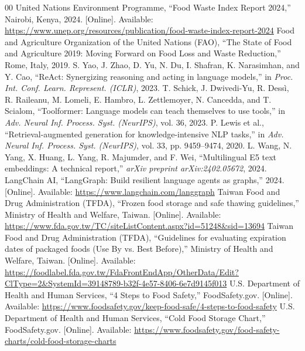 \documentclass[conference]{IEEEtran}
\begin{document}
\begin{thebibliography}{00}
 United Nations Environment Programme, ``Food Waste Index Report 2024,'' Nairobi, Kenya, 2024. [Online]. Available: \url{https://www.unep.org/resources/publication/food-waste-index-report-2024}
 Food and Agriculture Organization of the United Nations (FAO), ``The State of Food and Agriculture 2019: Moving Forward on Food Loss and Waste Reduction,'' Rome, Italy, 2019.
 S. Yao, J. Zhao, D. Yu, N. Du, I. Shafran, K. Narasimhan, and Y. Cao, ``ReAct: Synergizing reasoning and acting in language models,'' in \emph{Proc. Int. Conf. Learn. Represent. (ICLR)}, 2023.
 T. Schick, J. Dwivedi-Yu, R. Dess\`{i}, R. Raileanu, M. Lomeli, E. Hambro, L. Zettlemoyer, N. Cancedda, and T. Scialom, ``Toolformer: Language models can teach themselves to use tools,'' in \emph{Adv. Neural Inf. Process. Syst. (NeurIPS)}, vol. 36, 2023.
 P. Lewis et al., ``Retrieval-augmented generation for knowledge-intensive NLP tasks,'' in \emph{Adv. Neural Inf. Process. Syst. (NeurIPS)}, vol. 33, pp. 9459--9474, 2020.
 L. Wang, N. Yang, X. Huang, L. Yang, R. Majumder, and F. Wei, ``Multilingual E5 text embeddings: A technical report,'' \emph{arXiv preprint arXiv:2402.05672}, 2024.
 LangChain AI, ``LangGraph: Build resilient language agents as graphs,'' 2024. [Online]. Available: \url{https://www.langchain.com/langgraph}
 Taiwan Food and Drug Administration (TFDA), ``Frozen food storage and safe thawing guidelines,'' Ministry of Health and Welfare, Taiwan. [Online]. Available: \url{https://www.fda.gov.tw/TC/siteListContent.aspx?id=51248&sid=13694}
 Taiwan Food and Drug Administration (TFDA), ``Guidelines for evaluating expiration dates of packaged foods (Use By vs. Best Before),'' Ministry of Health and Welfare, Taiwan. [Online]. Available: \url{https://foodlabel.fda.gov.tw/FdaFrontEndApp/OtherData/Edit?ClType=2&SystemId=39148789-b32f-4e57-8406-6e7d9145f013}
 U.S. Department of Health and Human Services, ``4 Steps to Food Safety,'' FoodSafety.gov. [Online]. Available: \url{https://www.foodsafety.gov/keep-food-safe/4-steps-to-food-safety}
 U.S. Department of Health and Human Services, ``Cold Food Storage Chart,'' FoodSafety.gov. [Online]. Available: \url{https://www.foodsafety.gov/food-safety-charts/cold-food-storage-charts}
\end{thebibliography}
\end{document}

